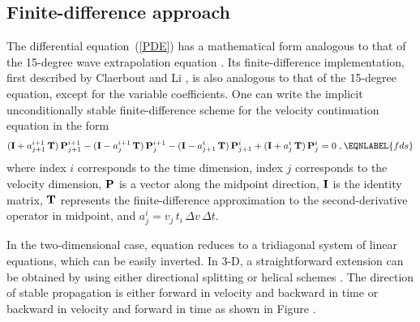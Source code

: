\subsection{Finite-difference approach}
The differential equation~(\ref{PDE}) has a mathematical form analogous to
that of the 15-degree wave extrapolation equation
\cite{Claerbout.blackwell.76}. Its finite-difference implementation, first
described by Claerbout  and Li
, is also analogous to that of the 15-degree equation,
except for the variable coefficients. One can write the implicit
unconditionally stable finite-difference scheme for the velocity continuation
equation in the form
\begin{equation}
({\bf I} + a_{j+1}^{i+1}\,{\bf T})\,{\bf P}_{j+1}^{i+1} - 
({\bf I} - a_{j}^{i+1}\,{\bf T})\,{\bf P}_{j}^{i+1} -
({\bf I} - a_{j+1}^{i}\,{\bf T})\,{\bf P}_{j+1}^{i} + 
({\bf I} + a_{j}^{i}\,{\bf T})\,{\bf P}_{j}^{i} = 0\;, 
\EQNLABEL{fds} 
\end{equation}
where index $i$ corresponds to the time dimension, index $j$
corresponds to the velocity dimension, ${\bf P}$ is a vector along the
midpoint direction, ${\bf I}$ is the identity matrix, ${\bf T}$
represents the finite-difference approximation to the 
second-derivative operator in midpoint,
and $a_{j}^{i} = v_j\,t_i\,{\Delta v\,\Delta t}$.

In the two-dimensional case, equation  reduces to a
tridiagonal system of linear equations, which can be easily inverted.
In 3-D, a straightforward extension can be obtained by using either
directional splitting or helical schemes \cite{SEG-1998-1124}. The
direction of stable propagation is either forward in velocity and
backward in time or backward in velocity and forward in time as shown
in Figure .


